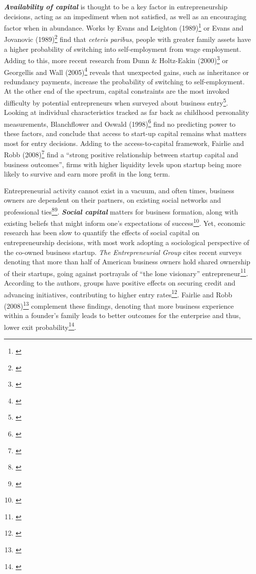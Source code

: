 \textbf{\textit{Availability of capital}} is thought to be a key factor in entrepreneurship decisions, acting as an impediment when not satisfied, as well as an encouraging factor when in abundance. Works by Evans and Leighton (1989)\footnote{\cite{EvansLeighton1989}} or Evans and Jovanovic (1989)\footnote{\cite{EvansJovanovic1989}} find that \textit{ceteris paribus}, people with greater family assets have a higher probability of switching into self-employment from wage employment. Adding to this, more recent research from Dunn & Holtz-Eakin (2000)\footnote{\cite{DunnHoltzEakin2000}} or Georgellis and Wall (2005)\footnote{\cite{GeorgellisWall2005}} reveals that unexpected gains, such as inheritance or redundancy payments, increase the probability of switching to self-employment. At the other end of the spectrum, capital constraints are the most invoked difficulty by potential entrepreneurs when surveyed about business entry\footnote{\cite{BlanchflowerOswald1998}}. Looking at individual characteristics tracked as far back as childhood personality measurements, Blanchflower and Oswald (1998)\footnote{\cite{BlanchflowerOswald1998}} find no predicting power to these factors, and conclude that access to start-up capital remains what matters most for entry decisions. Adding to the access-to-capital framework, Fairlie and Robb (2008)\footnote{\cite{FairlieRobb2008}} find a ``strong positive relationship between startup capital and business outcomes'', firms with higher liquidity levels upon startup being more likely to survive and earn more profit in the long term.

Entrepreneurial activity cannot exist in a vacuum, and often times, business owners are dependent on their partners, on existing social networks and professional ties\footnote{\cite{Lerner2009}}\hspace{.15em}\footnote{\cite[Page~74]{Parker2004}}. \textbf{\textit{Social capital}} matters for business formation, along with existing beliefs that might inform one's expectations of success\footnote{\cite{Lerner2009}}. Yet, economic research has been slow to quantify the effects of social capital on entrepreneurship decisions, with most work adopting a sociological perspective of the co-owned business startup. \textit{The Entrepreneurial Group} cites recent surveys denoting that more than half of American business owners hold shared ownership of their startups, going against portrayals of ``the lone visionary'' entrepreneur\footnote{\cite{Ruef2010}}. According to the authors, groups have positive effects on securing credit and advancing initiatives, contributing to higher entry rates\footnote{\cite{Ruef2010}}. Fairlie and Robb (2008)\footnote{\cite{FairlieRobb2008}} complement these findings, denoting that more business experience within a founder's family leads to better outcomes for the enterprise and thus, lower exit probability\footnote{\cite{FairlieRobb2008}}. 


